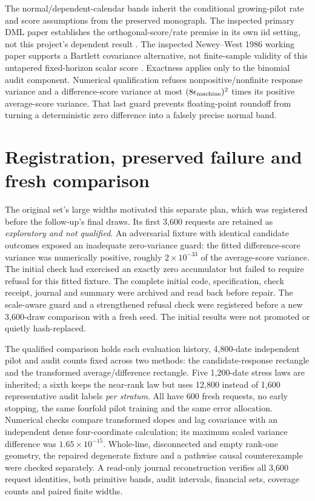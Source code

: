 The normal/dependent-calendar bands inherit the conditional growing-pilot
rate and score assumptions from the preserved monograph. The inspected
primary DML paper establishes the orthogonal-score/rate premise in its own
iid setting, not this project's dependent result \cite{dml2018}. The
inspected Newey--West 1986 working paper supports a Bartlett covariance
alternative, not finite-sample validity of this untapered fixed-horizon
scalar score \cite{newey1986}. Exactness applies only to the binomial audit
component. Numerical qualification refuses nonpositive/nonfinite response
variance and a difference-score variance at most
$(8\epsilon_{\rm machine})^2$ times its positive average-score variance.
That last guard prevents floating-point roundoff from turning a deterministic
zero difference into a falsely precise normal band.

\section{Registration, preserved failure and fresh comparison}

The original set's large widths motivated this separate plan, which was
registered before the follow-up's final draws. Its first 3,600 requests are
retained as \emph{exploratory and not qualified}. An adversarial fixture with
identical candidate outcomes exposed an inadequate zero-variance guard: the
fitted difference-score variance was numerically positive, roughly
$2\times10^{-33}$ of the average-score variance. The initial check had
exercised an exactly zero accumulator but failed to require refusal for this
fitted fixture. The complete initial code, specification, check receipt,
journal and summary were archived and read back before repair. The scale-aware
guard and a strengthened refusal check were registered before a new 3,600-draw
comparison with a fresh seed. The initial results were not promoted or
quietly hash-replaced.

The qualified comparison holds each evaluation history, 4,800-date independent
pilot and audit counts fixed across two methods: the candidate-response
rectangle and the transformed average/difference rectangle. Five 1,200-date
stress laws are inherited; a sixth keeps the near-rank law but uses 12,800
instead of 1,600 representative audit labels \emph{per stratum}. All have
600 fresh requests, no early stopping, the same fourfold pilot training and
the same error allocation. Numerical checks compare transformed slopes and
lag covariance with an independent dense four-coordinate calculation; its
maximum scaled variance difference was $1.65\times10^{-15}$. Whole-line,
disconnected and empty rank-one geometry, the repaired degenerate fixture and
a pathwise causal counterexample were checked separately. A read-only journal
reconstruction verifies all 3,600 request identities, both primitive bands,
audit intervals, financial sets, coverage counts and paired finite widths.

